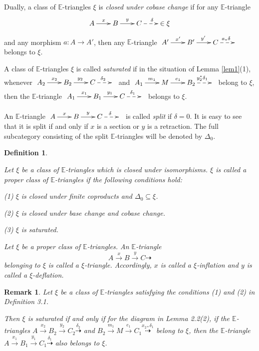 \documentclass[11pt,a4paper]{amsart}
\numberwithin{equation}{section}
\theoremstyle{plain}
\newtheorem{definition}[thm]{Definition}
\newtheorem{remark}[thm]{Remark}
\begin{document}
Dually, a class of  $\mathbb{E}$-triangles $\xi$ is {\it closed under cobase change} if for any $\mathbb{E}$-triangle $$\xymatrix@C=2em{A\ar[r]^x&B\ar[r]^y&C\ar@{-->}[r]^{\delta}&\in\xi}$$ and any morphism $a\colon A \to A'$, then any $\mathbb{E}$-triangle  $\xymatrix@C=2em{A'\ar[r]^{x'}&B'\ar[r]^{y'}&C\ar@{-->}[r]^{a_*\delta}&}$ belongs to $\xi$.

A class of $\mathbb{E}$-triangles $\xi$ is called {\it saturated} if in the situation of Lemma \ref{lem1}(1), whenever {
	$\xymatrix@C=2em{A_2\ar[r]^{x_2}&B_2\ar[r]^{y_2}&C\ar@{-->}[r]^{\delta_2 }&}$
	and $\xymatrix@C=2em{A_1\ar[r]^{m_1}&M\ar[r]^{e_1}&B_2\ar@{-->}[r]^{y_2^{\ast}\delta_1}&}$ }
belong to $\xi$, then the  $\mathbb{E}$-triangle $\xymatrix@C=2em{A_1\ar[r]^{x_1}&B_1\ar[r]^{y_1}&C\ar@{-->}[r]^{\delta_1 }&}$  belongs to $\xi$.

An $\mathbb{E}$-triangle $\xymatrix@C=2em{A\ar[r]^x&B\ar[r]^y&C\ar@{-->}[r]^{\delta}&}$ is called {\it split} if $\delta=0$. It is easy to see that it is split if and only if $x$ is a section or $y$ is a retraction. The full subcategory  consisting of the split $\mathbb{E}$-triangles will be denoted by $\Delta_0$.

\begin{definition} \label{def:proper class}{\rm  Let $\xi$ be a class of $\mathbb{E}$-triangles which is closed under isomorphisms. $\xi$ is called a {\it proper class} of $\mathbb{E}$-triangles if the following conditions hold:
		
		(1) $\xi$ is closed under finite coproducts and $\Delta_0\subseteq \xi$.
		
		(2) $\xi$ is closed under base change and cobase change.
		
		(3) $\xi$ is saturated.}
		
		
		

			Let $\xi$ be a proper class of $\mathbb E$-triangles.
			An $\mathbb E$-triangle
			\[
			A\overset{x}{\longrightarrow}
			B\overset{y}{\longrightarrow}
			C\dashrightarrow
			\]
			belonging to $\xi$ is called a $\xi$-triangle.
			Accordingly, $x$ is called a $\xi$-inflation and
			$y$ is called a $\xi$-deflation.
	
	\end{definition}
	\begin{remark}
		Let $\xi$ be a class of $\mathbb{E}$-triangles satisfying the conditions (1) and (2) in Deﬁnition 3.1.
		
		Then $\xi$ is saturated if and only if for the diagram in Lemma 2.2(2),  if the $\mathbb{E}$-triangles $A \xrightarrow{x_2} B_2 \xrightarrow{y_2} C_2 \stackrel{\delta_2}{\dashrightarrow}$ and $B_2 \xrightarrow{m_1} M \xrightarrow{e_1} C_1 \stackrel{x_{2*}\delta_1}{\dashrightarrow}$ belong to $\xi$, then the $\mathbb{E}$-triangle $A \xrightarrow{x_1} B_1 \xrightarrow{y_1} C_1 \stackrel{\delta_1}{\dashrightarrow}$ also belongs to $\xi$.
	\end{remark}
	
\end{document}
